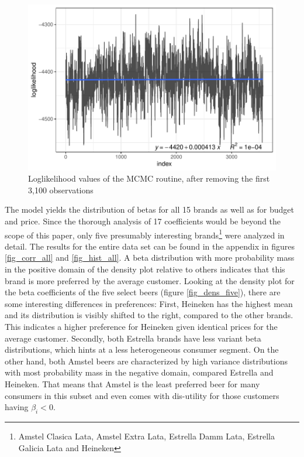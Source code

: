 \documentclass[12pt,a4paper]{article}
\begin{document}
\begin{figure}[ht]
	\centering
  \includegraphics[scale = 0.7]{figures/mcmc_after_burnin_fitted.pdf}
	\caption{Loglikelihood values of the MCMC routine, after removing the first 3,100 observations}
	\label{fig_mcmc_burnin}
\end{figure}

The model yields the distribution of betas for all 15 brands as well as for budget and price.
Since the thorough analysis of 17 coefficients would be beyond the scope of this paper, only five presumably interesting brands\footnote{Amstel Clasica Lata, Amstel Extra Lata, Estrella Damm Lata, Estrella Galicia Lata and Heineken} were analyzed in detail.
The results for the entire data set can be found in the appendix in figures \ref{fig_corr_all} and \ref{fig_hist_all}.
A beta distribution with more probability mass in the positive domain of the density plot relative to others indicates that this brand is more preferred by the average customer.
Looking at the density plot for the beta coefficients of the five select beers (figure \ref{fig_dens_five}), there are some interesting differences in preferences:
First, Heineken has the highest mean and its distribution is visibly shifted to the right, compared to the other brands.
This indicates a higher preference for Heineken given identical prices for the average customer.
Secondly, both Estrella brands have less variant beta distributions, which hints at a less heterogeneous consumer segment.
On the other hand, both Amstel beers are characterized by high variance distributions with most probability mass in the negative domain, compared Estrella and Heineken.
That means that Amstel is the least preferred beer for many consumers in this subset and even comes with dis-utility for those customers having $\beta_{i}<0$.
\end{document}
